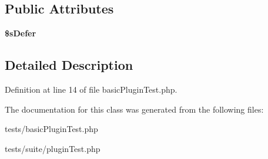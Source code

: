 \subsection*{Public Attributes}
\begin{DoxyCompactItemize}
\item 
\hypertarget{classtestPlugin_ac1eb90b921936dc08c8ab54d707484cb}{
{\bfseries \$sDefer}}
\label{classtestPlugin_ac1eb90b921936dc08c8ab54d707484cb}

\end{DoxyCompactItemize}


\subsection{Detailed Description}


Definition at line 14 of file basicPluginTest.php.



The documentation for this class was generated from the following files:\begin{DoxyCompactItemize}
\item 
tests/basicPluginTest.php\item 
tests/suite/pluginTest.php\end{DoxyCompactItemize}
